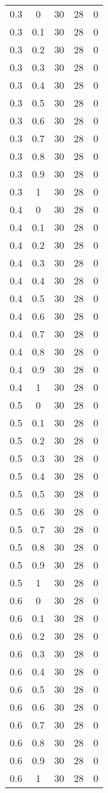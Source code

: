 \begin{longtable}{|c|c|c|c|c|}
	0.3& 0& 30& 28& 0\\
	0.3& 0.1& 30& 28& 0\\
	0.3& 0.2& 30& 28& 0\\
	0.3& 0.3& 30& 28& 0\\
	0.3& 0.4& 30& 28& 0\\
	0.3& 0.5& 30& 28& 0\\
	0.3& 0.6& 30& 28& 0\\
	0.3& 0.7& 30& 28& 0\\
	0.3& 0.8& 30& 28& 0\\
	0.3& 0.9& 30& 28& 0\\
	0.3& 1& 30& 28& 0\\
	\hline
	
	0.4& 0& 30& 28& 0\\
	0.4& 0.1& 30& 28& 0\\
	0.4& 0.2& 30& 28& 0\\
	0.4& 0.3& 30& 28& 0\\
	0.4& 0.4& 30& 28& 0\\
	0.4& 0.5& 30& 28& 0\\
	0.4& 0.6& 30& 28& 0\\
	0.4& 0.7& 30& 28& 0\\
	0.4& 0.8& 30& 28& 0\\
	0.4& 0.9& 30& 28& 0\\
	0.4& 1& 30& 28& 0\\
	\hline
	
	0.5& 0& 30& 28& 0\\
	0.5& 0.1& 30& 28& 0\\
	0.5& 0.2& 30& 28& 0\\
	0.5& 0.3& 30& 28& 0\\
	0.5& 0.4& 30& 28& 0\\
	0.5& 0.5& 30& 28& 0\\
	0.5& 0.6& 30& 28& 0\\
	0.5& 0.7& 30& 28& 0\\
	0.5& 0.8& 30& 28& 0\\
	0.5& 0.9& 30& 28& 0\\
	0.5& 1& 30& 28& 0\\
	\hline
	
	0.6& 0& 30& 28& 0\\
	0.6& 0.1& 30& 28& 0\\
	0.6& 0.2& 30& 28& 0\\
	0.6& 0.3& 30& 28& 0\\
	0.6& 0.4& 30& 28& 0\\
	0.6& 0.5& 30& 28& 0\\
	0.6& 0.6& 30& 28& 0\\
	0.6& 0.7& 30& 28& 0\\
	0.6& 0.8& 30& 28& 0\\
	0.6& 0.9& 30& 28& 0\\
	0.6& 1& 30& 28& 0\\
	\hline
	

\end{longtable}
